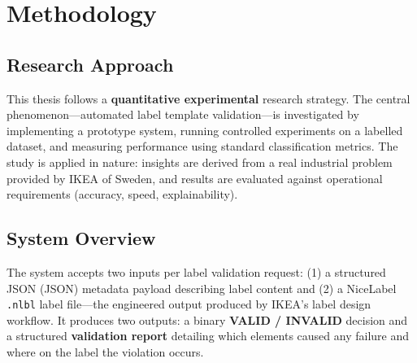 \chapter{Methodology}
\label{ch:methodology}

\section{Research Approach}

This thesis follows a \textbf{quantitative experimental} research strategy. The central
phenomenon—automated label template validation—is investigated by implementing a
prototype system, running controlled experiments on a labelled dataset, and measuring
performance using standard classification metrics. The study is applied in nature:
insights are derived from a real industrial problem provided by IKEA of Sweden,
and results are evaluated against operational requirements (accuracy, speed, explainability).

\section{System Overview}
\label{sec:sys_overview}

The system accepts two inputs per label validation request: (1) a structured
\acl{JSON} (JSON) metadata payload describing label content and (2) a NiceLabel
\texttt{.nlbl} label file—the engineered output produced by IKEA's label design workflow.
It produces two outputs: a binary \textbf{VALID / INVALID} decision and a structured
\textbf{validation report} detailing which elements caused any failure and where on the
label the violation occurs.

